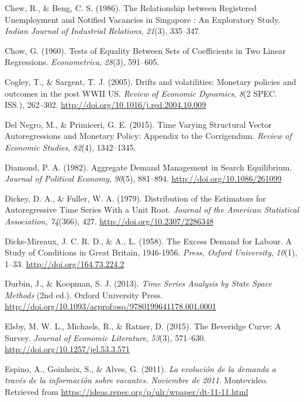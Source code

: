 \documentclass[12pt,oneside]{reedthesis}
\begin{document}
\leavevmode\hypertarget{ref-Chew1986}{}%
Chew, R., \& Beng, C. S. (1986). The Relationship between Registered Unemployment and Notified Vacancies in Singapore : An Exploratory Study. \emph{Indian Journal of Industrial Relations}, \emph{21}(3), 335--347.

\leavevmode\hypertarget{ref-Chow1960}{}%
Chow, G. (1960). Tests of Equality Between Sets of Coefficients in Two Linear Regressions. \emph{Econometrica}, \emph{28}(3), 591--605.

\leavevmode\hypertarget{ref-Cogley2005}{}%
Cogley, T., \& Sargent, T. J. (2005). Drifts and volatilities: Monetary policies and outcomes in the post WWII US. \emph{Review of Economic Dynamics}, \emph{8}(2 SPEC. ISS.), 262--302. \url{http://doi.org/10.1016/j.red.2004.10.009}

\leavevmode\hypertarget{ref-DelNegro2015}{}%
Del Negro, M., \& Primiceri, G. E. (2015). Time Varying Structural Vector Autoregressions and Monetary Policy: Appendix to the Corrigendum. \emph{Review of Economic Studies}, \emph{82}(4), 1342--1345.

\leavevmode\hypertarget{ref-Diamond1982}{}%
Diamond, P. A. (1982). Aggregate Demand Management in Search Equilibrium. \emph{Journal of Political Economy}, \emph{90}(5), 881--894. \url{http://doi.org/10.1086/261099}

\leavevmode\hypertarget{ref-DickeyFuller1979}{}%
Dickey, D. A., \& Fuller, W. A. (1979). Distribution of the Estimators for Autoregressive Time Series With a Unit Root. \emph{Journal of the American Statistical Association}, \emph{74}(366), 427. \url{http://doi.org/10.2307/2286348}

\leavevmode\hypertarget{ref-Dicks-Mireaux1958}{}%
Dicks-Mireaux, J. C. R. D., \& A., L. (1958). The Excess Demand for Labour. A Study of Conditions in Great Britain, 1946-1956. \emph{Press, Oxford University}, \emph{10}(1), 1--33. \url{http://doi.org/164.73.224.2}

\leavevmode\hypertarget{ref-Durbin2013}{}%
Durbin, J., \& Koopman, S. J. (2013). \emph{Time Series Analysis by State Space Methods} (2nd ed.). Oxford University Press. \url{http://doi.org/10.1093/acprof:oso/9780199641178.001.0001}

\leavevmode\hypertarget{ref-Elsby2015}{}%
Elsby, M. W. L., Michaels, R., \& Ratner, D. (2015). The Beveridge Curve: A Survey. \emph{Journal of Economic Literature}, \emph{53}(3), 571--630. \url{http://doi.org/10.1257/jel.53.3.571}

\leavevmode\hypertarget{ref-Alma2011}{}%
Espino, A., Goinheix, S., \& Alves, G. (2011). \emph{La evolución de la demanda a través de la información sobre vacantes. Noviembre de 2011}. Montevideo. Retrieved from \url{https://ideas.repec.org/p/ulr/wpaper/dt-11-11.html}
\end{document}
